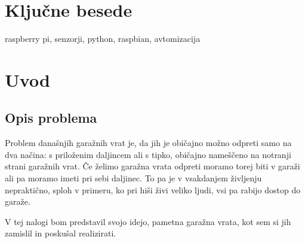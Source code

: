 \documentclass[11pt]{article}
\begin{document}
\section*{Ključne besede}
raspberry pi, senzorji, python, raspbian, avtomizacija

\printglossary[type=\acronymtype,title={Kratice}]

\renewcommand{\baselinestretch}{0.90}\normalsize
\newpage
{}
\thispagestyle{empty}
\tableofcontents
\newpage
\listoffigures
\renewcommand{\baselinestretch}{1.0}\normalsize
\newpage

\pagestyle{fancy}
\fancyhead{}
\fancyfoot{}
\fancyfoot[C]{\thepage}


\newpage
{}
\setcounter{page}{6}
\section{Uvod}
\subsection{Opis problema}
Problem današnjih garažnih vrat je, da jih je običajno možno odpreti samo na dva načina: s priloženim daljincem ali s tipko, običajno nameščeno na notranji strani garažnih vrat. Če želimo garažna vrata odpreti moramo torej biti v garaži ali pa moramo imeti pri sebi daljinec. To pa je v vsakdanjem življenju nepraktično, sploh v primeru, ko pri hiši živi veliko ljudi, vsi pa rabijo dostop do garaže.

V tej nalogi bom predstavil svojo idejo, pametna garažna vrata, kot sem si jih zamislil in poskušal realizirati.
\end{document}
